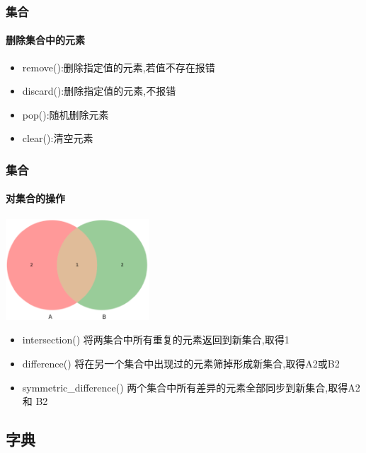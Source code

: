 \documentclass{beamer}
\begin{document}
\begin{frame}[t]
	\frametitle{集合}
	\framesubtitle{删除集合中的元素}
	\begin{itemize}
		\item remove():删除指定值的元素,若值不存在报错

		\item discard():删除指定值的元素,不报错

		\item pop():随机删除元素
		\item clear():清空元素
	\end{itemize}
\end{frame}
\begin{frame}[t]
	\frametitle{集合}
	\framesubtitle{对集合的操作}
	\begin{center}
		\includegraphics[width=0.4\textwidth]{venn_diagram.eps}
	\end{center}
	\begin{itemize}
		\item intersection()   将两集合中所有重复的元素返回到新集合,取得1
		\item difference()	将在另一个集合中出现过的元素筛掉形成新集合,取得A2或B2
		\item symmetric\_difference()  两个集合中所有差异的元素全部同步到新集合,取得A2 和 B2
	\end{itemize}

\end{frame}

\subsection{字典}
\end{document}
